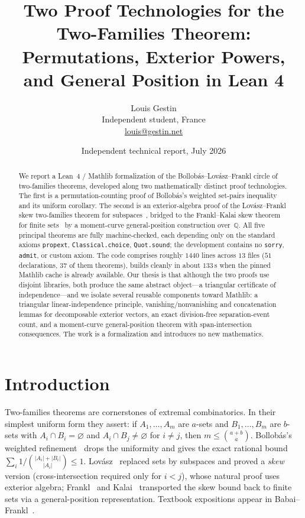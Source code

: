 \documentclass[11pt]{article}
\title{Two Proof Technologies for the Two-Families Theorem:\\
Permutations, Exterior Powers, and General Position in Lean 4}
\author{Louis Gestin\\\small Independent student, France\\\small \href{mailto:louis@gestin.net}{louis@gestin.net}}
\date{Independent technical report, July 2026}
\newcommand{\QQ}{\mathbb{Q}}
\newcommand{\bind}[2]{\binom{#1}{#2}}
\begin{document}
\maketitle

\begin{abstract}
We report a Lean~4 / Mathlib formalization of the Bollob\'{a}s--Lov\'{a}sz--Frankl
circle of two-families theorems, developed along two mathematically distinct proof
technologies. The first is a permutation-counting proof of Bollob\'{a}s's weighted
set-pairs inequality~\cite{bollobas1965} and its uniform corollary. The second is an
exterior-algebra proof of the Lov\'{a}sz--Frankl skew two-families theorem for
subspaces~\cite{lovasz1977}, bridged to the Frankl--Kalai skew theorem for finite
sets~\cite{frankl1982,kalai1984} by a moment-curve general-position construction
over~$\QQ$. All five principal theorems are fully machine-checked, each depending only
on the standard axioms \texttt{propext}, \texttt{Classical.choice}, \texttt{Quot.sound};
the development contains no \texttt{sorry}, \texttt{admit}, or custom axiom. The code
comprises roughly $1440$ lines across $13$ files ($51$ declarations, $37$ of them
theorems), builds cleanly in about $133$\,s when the pinned Mathlib cache is already available. Our thesis is that although the two proofs
use disjoint libraries, both produce the same abstract object---a triangular
certificate of independence---and we isolate several reusable components toward Mathlib:
a triangular linear-independence principle, vanishing/nonvanishing and concatenation
lemmas for decomposable exterior vectors, an exact division-free separation-event
count, and a moment-curve general-position theorem with span-intersection consequences.
The work is a formalization and introduces no new mathematics.
\end{abstract}

\section{Introduction}\label{sec:intro}

Two-families theorems are cornerstones of extremal combinatorics. In their simplest
uniform form they assert: if $A_1,\dots,A_m$ are $a$-sets and $B_1,\dots,B_m$ are
$b$-sets with $A_i\cap B_i=\varnothing$ and $A_i\cap B_j\neq\varnothing$ for $i\neq j$,
then $m\le\bind{a+b}{a}$. Bollob\'{a}s's weighted refinement~\cite{bollobas1965} drops
the uniformity and gives the exact rational bound
$\sum_i 1/\bind{|A_i|+|B_i|}{|A_i|}\le 1$. Lov\'{a}sz~\cite{lovasz1977} replaced sets by
subspaces and proved a \emph{skew} version (cross-intersection required only for
$i<j$), whose natural proof uses exterior algebra; Frankl~\cite{frankl1982} and
Kalai~\cite{kalai1984} transported the skew bound back to finite sets via a
general-position representation. Textbook expositions appear in
Babai--Frankl~\cite{babaifrankl1992}.
\end{document}

